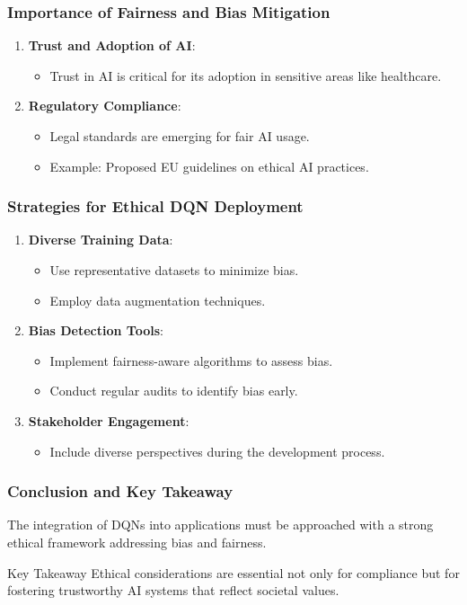 \documentclass{beamer}
\begin{document}
\begin{frame}[fragile]
    \frametitle{Importance of Fairness and Bias Mitigation}
    \begin{enumerate}
        \item \textbf{Trust and Adoption of AI}:
            \begin{itemize}
                \item Trust in AI is critical for its adoption in sensitive areas like healthcare.
            \end{itemize}
        \item \textbf{Regulatory Compliance}:
            \begin{itemize}
                \item Legal standards are emerging for fair AI usage.
                \item Example: Proposed EU guidelines on ethical AI practices.
            \end{itemize}
    \end{enumerate}
\end{frame}

\begin{frame}[fragile]
    \frametitle{Strategies for Ethical DQN Deployment}
    \begin{enumerate}
        \item \textbf{Diverse Training Data}:
            \begin{itemize}
                \item Use representative datasets to minimize bias.
                \item Employ data augmentation techniques.
            \end{itemize}
        \item \textbf{Bias Detection Tools}:
            \begin{itemize}
                \item Implement fairness-aware algorithms to assess bias.
                \item Conduct regular audits to identify bias early.
            \end{itemize}
        \item \textbf{Stakeholder Engagement}:
            \begin{itemize}
                \item Include diverse perspectives during the development process.
            \end{itemize}
    \end{enumerate}
\end{frame}

\begin{frame}[fragile]
    \frametitle{Conclusion and Key Takeaway}
    The integration of DQNs into applications must be approached with a strong ethical framework addressing bias and fairness.
    \begin{block}{Key Takeaway}
        Ethical considerations are essential not only for compliance but for fostering trustworthy AI systems that reflect societal values.
    \end{block}
\end{frame}
\end{document}
